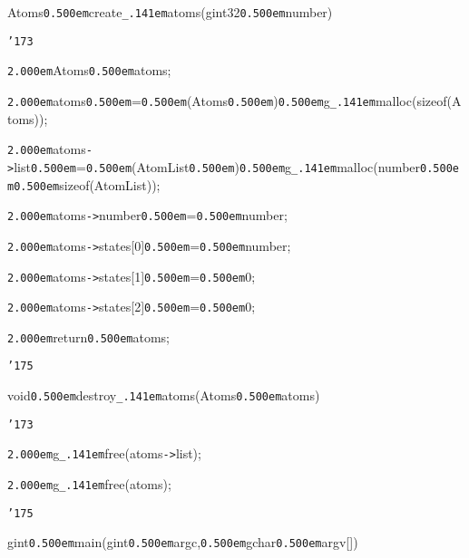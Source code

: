 \noindent
{}\hfill

\noindent
{}Atoms{\tt\mc \kern0.500em}{\tt *}create{\tt\_\kern.141em}atoms(gint32{\tt\mc \kern0.500em}number)

\noindent
{}{\tt\char'173}

\noindent
{}{\tt\mc \kern2.000em}Atoms{\tt\mc \kern0.500em}{\tt *}atoms;

\noindent
{}\hfill

\noindent
{}{\tt\mc \kern2.000em}atoms{\tt\mc \kern0.500em}={\tt\mc \kern0.500em}(Atoms{\tt\mc \kern0.500em}{\tt *}){\tt\mc \kern0.500em}g{\tt\_\kern.141em}malloc(sizeof(Atoms));

\noindent
{}{\tt\mc \kern2.000em}atoms{\tt -}{\tt >}list{\tt\mc \kern0.500em}={\tt\mc \kern0.500em}(AtomList{\tt\mc \kern0.500em}{\tt *}){\tt\mc \kern0.500em}g{\tt\_\kern.141em}malloc(number{\tt\mc \kern0.500em}{\tt *}{\tt\mc \kern0.500em}sizeof(AtomList));

\noindent
{}\hfill

\noindent
{}{\tt\mc \kern2.000em}atoms{\tt -}{\tt >}number{\tt\mc \kern0.500em}={\tt\mc \kern0.500em}number;

\noindent
{}{\tt\mc \kern2.000em}atoms{\tt -}{\tt >}states[0]{\tt\mc \kern0.500em}={\tt\mc \kern0.500em}number;

\noindent
{}{\tt\mc \kern2.000em}atoms{\tt -}{\tt >}states[1]{\tt\mc \kern0.500em}={\tt\mc \kern0.500em}0;

\noindent
{}{\tt\mc \kern2.000em}atoms{\tt -}{\tt >}states[2]{\tt\mc \kern0.500em}={\tt\mc \kern0.500em}0;

\noindent
{}\hfill

\noindent
{}{\tt\mc \kern2.000em}return{\tt\mc \kern0.500em}atoms;

\noindent
{}{\tt\char'175}

\noindent
{}\hfill

\noindent
{}void{\tt\mc \kern0.500em}destroy{\tt\_\kern.141em}atoms(Atoms{\tt\mc \kern0.500em}{\tt *}atoms)

\noindent
{}{\tt\char'173}

\noindent
{}{\tt\mc \kern2.000em}g{\tt\_\kern.141em}free(atoms{\tt -}{\tt >}list);

\noindent
{}{\tt\mc \kern2.000em}g{\tt\_\kern.141em}free(atoms);

\noindent
{}{\tt\char'175}

\noindent
{}\hfill

\newpage

\noindent
{}gint{\tt\mc \kern0.500em}main(gint{\tt\mc \kern0.500em}argc,{\tt\mc \kern0.500em}gchar{\tt\mc \kern0.500em}{\tt *}argv[])

